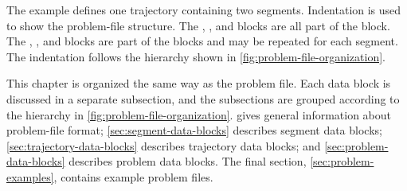 The example defines one trajectory containing two segments. Indentation is used to
show the problem-file structure. The ,
, and  blocks are all part of the
 block. The ,
, and  blocks are part of the
 blocks and may be repeated for each segment. The
indentation follows the hierarchy shown in \cref{fig:problem-file-organization}.

This chapter is organized the same way as the problem file. Each data block is
discussed in a separate subsection, and the subsections are grouped according to the
hierarchy in \cref{fig:problem-file-organization}. 
 gives general information about problem-file format;
\cref{sec:segment-data-blocks} describes segment data blocks;
\cref{sec:trajectory-data-blocks} describes trajectory data blocks; and
\cref{sec:problem-data-blocks} describes problem data blocks. The final section,
\cref{sec:problem-examples}, contains example problem files.
